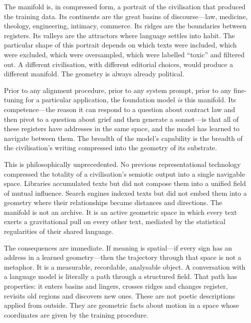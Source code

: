 The manifold is, in compressed form, a portrait of the civilisation that produced the training data. Its continents are the great basins of discourse---law, medicine, theology, engineering, intimacy, commerce. Its ridges are the boundaries between registers. Its valleys are the attractors where language settles into habit. The particular shape of this portrait depends on which texts were included, which were excluded, which were oversampled, which were labelled ``toxic'' and filtered out. A different civilisation, with different editorial choices, would produce a different manifold. The geometry is always already political.

Prior to any alignment procedure, prior to any system prompt, prior to any fine-tuning for a particular application, the foundation model \textit{is} this manifold. Its competence---the reason it can respond to a question about contract law and then pivot to a question about grief and then generate a sonnet---is that all of these registers have addresses in the same space, and the model has learned to navigate between them. The breadth of the model's capability is the breadth of the civilisation's writing compressed into the geometry of its substrate.

This is philosophically unprecedented. No previous representational technology compressed the totality of a civilisation's semiotic output into a single navigable space. Libraries accumulated texts but did not compose them into a unified field of mutual influence. Search engines indexed texts but did not embed them into a geometry where their relationships became distances and directions. The manifold is not an archive. It is an active geometric space in which every text exerts a gravitational pull on every other text, mediated by the statistical regularities of their shared language.

The consequences are immediate. If meaning is spatial---if every sign has an address in a learned geometry---then the trajectory through that space is not a metaphor. It is a measurable, recordable, analysable object. A conversation with a language model is literally a path through a structured field. That path has properties: it enters basins and lingers, crosses ridges and changes register, revisits old regions and discovers new ones. These are not poetic descriptions applied from outside. They are geometric facts about motion in a space whose coordinates are given by the training procedure.


